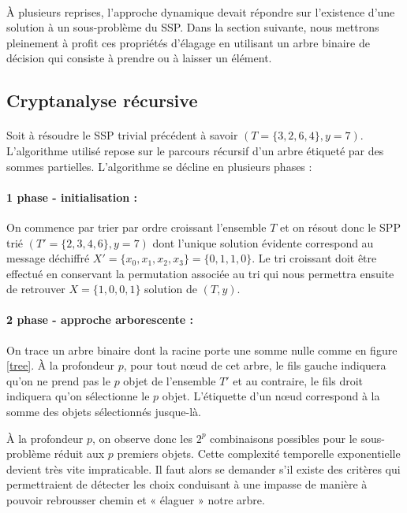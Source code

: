 \paragraph{} À plusieurs reprises, l'approche dynamique devait répondre sur l'existence d'une solution à un sous-problème du SSP. Dans la section suivante, nous mettrons pleinement à profit ces propriétés d'élagage en utilisant un arbre binaire de décision qui consiste à prendre ou à laisser un élément.


\subsection{Cryptanalyse récursive}
\label{rec}

\paragraph{} 
Soit à résoudre le SSP trivial précédent à savoir $(T = \{3, 2, 6, 4\}, y = 7)$. 
L'algorithme utilisé repose sur le parcours récursif d'un arbre étiqueté par des sommes partielles.
L'algorithme se décline en plusieurs phases :

\paragraph{1\iere{} phase - initialisation :} On commence par trier par ordre croissant l'ensemble $T$ et on résout donc le SPP trié $(T' = \{2, 3, 4, 6\}, y = 7)$
dont l'unique solution évidente correspond au message déchiffré $X' = \{x_0, x_1, x_2, x_3\} = \{0, 1, 1, 0\}$. Le tri croissant doit être effectué en conservant la permutation associée au tri qui nous permettra ensuite de retrouver $X = \{1, 0, 0, 1\}$ solution de $(T, y)$.

\paragraph{2\ieme{} phase - approche arborescente :} On trace un arbre binaire dont la racine porte une somme nulle comme en figure \ref{tree}. 
À la profondeur $p$, pour tout nœud de cet arbre, le fils gauche indiquera qu'on ne prend pas le $p$\ieme{} objet de l'ensemble $T'$ et au contraire, le fils droit indiquera qu'on sélectionne le $p$\ieme{} objet. L'étiquette d'un nœud correspond à la somme des objets sélectionnés jusque-là.

À la profondeur $p$, on observe donc les $2^{p}$ combinaisons possibles pour le sous-problème réduit aux $p$ premiers objets. Cette complexité temporelle exponentielle devient très vite impraticable. Il faut alors se demander s'il existe des critères qui permettraient de détecter les choix conduisant à une impasse de manière à pouvoir rebrousser chemin 
et « élaguer » notre arbre.


